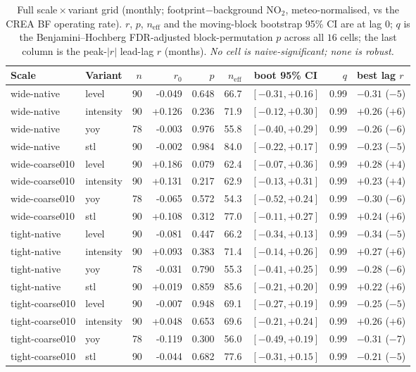 \documentclass[11pt,a4paper]{article}
\providecommand{\ce}[1]{\ensuremath{\mathrm{#1}}}
\begin{document}
\begin{table}[t]
\centering
\caption{Full scale\,$\times$\,variant grid (monthly; footprint$-$background \ce{NO_2},
meteo-normalised, vs the CREA BF operating rate). $r$, $p$, $n_{\text{eff}}$ and the
moving-block bootstrap 95\% CI are at lag $0$; $q$ is the Benjamini--Hochberg FDR-adjusted
block-permutation $p$ across all $16$ cells; the last column is the peak-$|r|$ lead-lag $r$
(months). \emph{No cell is naive-significant; none is robust.}}
\label{tab:grid}
\small
\begin{tabular}{llrrrrcrl}
\toprule
Scale & Variant & {$n$} & {$r_{0}$} & {$p$} & {$n_{\text{eff}}$} & {boot 95\% CI} & {$q$} & {best lag $r$} \\
\midrule
wide-native     & level     & 90 & -0.049 & 0.648 & 66.7 & $[-0.31,+0.16]$ & 0.99 & $-0.31$ ($-5$) \\
wide-native     & intensity & 90 & +0.126 & 0.236 & 71.9 & $[-0.12,+0.30]$ & 0.99 & $+0.26$ ($+6$) \\
wide-native     & yoy       & 78 & -0.003 & 0.976 & 55.8 & $[-0.40,+0.29]$ & 0.99 & $-0.26$ ($-6$) \\
wide-native     & stl       & 90 & -0.002 & 0.984 & 84.0 & $[-0.22,+0.17]$ & 0.99 & $-0.23$ ($-5$) \\
\addlinespace
wide-coarse010  & level     & 90 & +0.186 & 0.079 & 62.4 & $[-0.07,+0.36]$ & 0.99 & $+0.28$ ($+4$) \\
wide-coarse010  & intensity & 90 & +0.131 & 0.217 & 62.9 & $[-0.13,+0.31]$ & 0.99 & $+0.23$ ($+4$) \\
wide-coarse010  & yoy       & 78 & -0.065 & 0.572 & 54.3 & $[-0.52,+0.24]$ & 0.99 & $-0.30$ ($-6$) \\
wide-coarse010  & stl       & 90 & +0.108 & 0.312 & 77.0 & $[-0.11,+0.27]$ & 0.99 & $+0.24$ ($+6$) \\
\addlinespace
tight-native    & level     & 90 & -0.081 & 0.447 & 66.2 & $[-0.34,+0.13]$ & 0.99 & $-0.34$ ($-5$) \\
tight-native    & intensity & 90 & +0.093 & 0.383 & 71.4 & $[-0.14,+0.26]$ & 0.99 & $+0.27$ ($+6$) \\
tight-native    & yoy       & 78 & -0.031 & 0.790 & 55.3 & $[-0.41,+0.25]$ & 0.99 & $-0.28$ ($-6$) \\
tight-native    & stl       & 90 & +0.019 & 0.859 & 85.6 & $[-0.21,+0.20]$ & 0.99 & $+0.22$ ($+6$) \\
\addlinespace
tight-coarse010 & level     & 90 & -0.007 & 0.948 & 69.1 & $[-0.27,+0.19]$ & 0.99 & $-0.25$ ($-5$) \\
tight-coarse010 & intensity & 90 & +0.048 & 0.653 & 69.6 & $[-0.21,+0.24]$ & 0.99 & $+0.26$ ($+6$) \\
tight-coarse010 & yoy       & 78 & -0.119 & 0.300 & 56.0 & $[-0.49,+0.19]$ & 0.99 & $-0.31$ ($-7$) \\
tight-coarse010 & stl       & 90 & -0.044 & 0.682 & 77.6 & $[-0.31,+0.15]$ & 0.99 & $-0.21$ ($-5$) \\
\bottomrule
\end{tabular}
\end{table}
\end{document}
